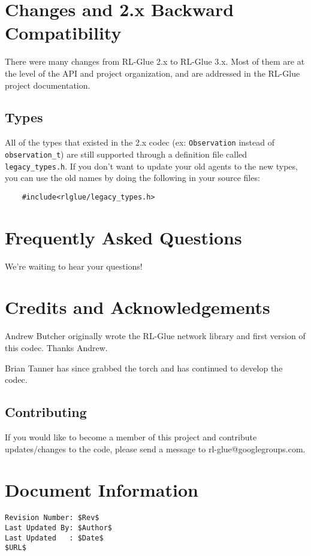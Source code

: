 \documentclass[11pt]{article}
\begin{document}
\section{Changes and 2.x Backward Compatibility}
There were many changes from RL-Glue 2.x to RL-Glue 3.x.  Most of them are at the level of the API and project organization, and are addressed in the RL-Glue 
project documentation.

\subsection{Types}
All of the types that existed in the 2.x codec (ex: \texttt{Observation} instead of \texttt{observation\_t}) are still supported through a definition file called 
\texttt{legacy\_types.h}.  If you don't want to update your old agents to the new types, you can use the old names by doing the following in your source files:
\begin{verbatim}
	#include<rlglue/legacy_types.h>
\end{verbatim}



\section{Frequently Asked Questions}
We're waiting to hear your questions!

\section{Credits and Acknowledgements}
Andrew Butcher originally wrote the RL-Glue network library and first version of this codec.  Thanks Andrew.

Brian Tanner has since grabbed the torch and has continued to develop the codec.

\subsection{Contributing}
If you would like to become a member of this project and contribute updates/changes to the code, please send a message to rl-glue@googlegroups.com.


\section*{Document Information}
\begin{verbatim}
Revision Number: $Rev$
Last Updated By: $Author$
Last Updated   : $Date$
$URL$
\end{verbatim}
\end{document}
